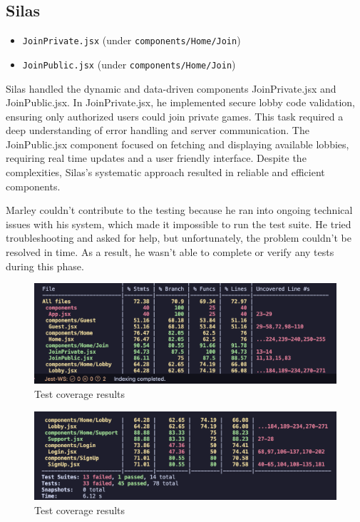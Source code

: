 \subsection*{Silas}
\begin{itemize}
    \item \texttt{JoinPrivate.jsx} (under \texttt{components/Home/Join})
    \item \texttt{JoinPublic.jsx} (under \texttt{components/Home/Join})
\end{itemize}

\noindent Silas handled the dynamic and data-driven components JoinPrivate.jsx and JoinPublic.jsx. In JoinPrivate.jsx, he implemented secure lobby code validation, ensuring only authorized users could join private games. This task required a deep understanding of error handling and server communication. The JoinPublic.jsx component focused on fetching and displaying available lobbies, requiring real time updates and a user friendly interface. Despite the complexities, Silas’s systematic approach resulted in reliable and efficient components.

\noindent Marley couldn’t contribute to the testing because he ran into ongoing technical issues with his system, which made it impossible to run the test suite. He tried troubleshooting and asked for help, but unfortunately, the problem couldn’t be resolved in time. As a result, he wasn’t able to complete or verify any tests during this phase.

\begin{figure}[H]
    \centering
    \includegraphics[width=0.8\linewidth]{branch1.png}
    \caption{Test coverage results}
    \label{fig:branch1}
\end{figure}

\begin{figure}[H]
    \centering
    \includegraphics[width=0.8\linewidth]{branch2.png}
    \caption{Test coverage results}
    \label{fig:branch2}
\end{figure}

